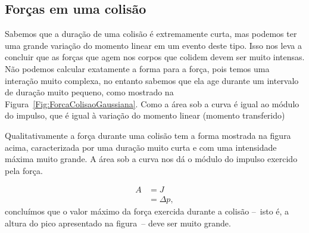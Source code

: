 \subsection{Forças em uma colisão}

Sabemos que a duração de uma colisão é extremamente curta, mas podemos ter uma grande variação do momento linear em um evento deste tipo. Isso nos leva a concluir que as forças que agem nos corpos que colidem devem ser muito intensas. Não podemos calcular exatamente a forma para a força, pois temos uma interação muito complexa, no entanto sabemos que ela age durante um intervalo de duração muito pequeno, como mostrado na Figura~\ref{Fig:ForcaColisaoGaussiana}. Como a área sob a curva é igual ao módulo do impulso, que é igual à variação do momento linear (momento transferido)
%
\begin{marginfigure}
\centering
{}
\caption{Qualitativamente a força durante uma colisão tem a forma mostrada na figura acima, caracterizada por uma duração muito curta e com uma intensidade máxima muito grande. A área sob a curva nos dá o módulo do impulso exercido pela força.\label{Fig:ForcaColisaoGaussiana}}
\end{marginfigure}
%
\begin{align}
    A &= J \\
    &= \Delta p,
\end{align}
%
concluímos que o valor máximo da força exercida durante a colisão --~isto é, a altura do pico apresentado na figura~-- deve ser muito grande.

